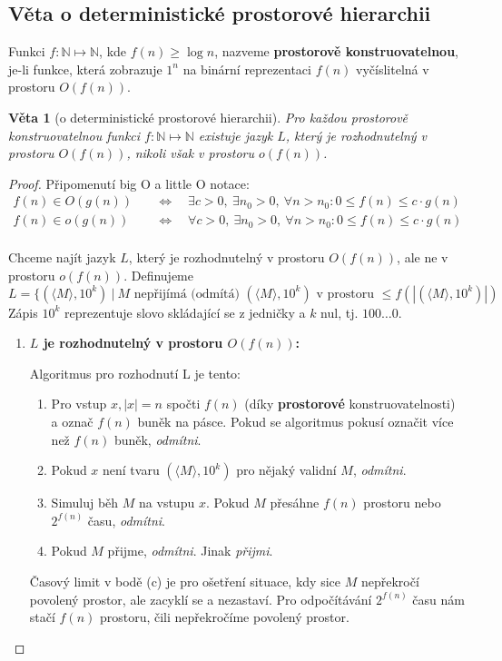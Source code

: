 \documentclass[11pt]{report} %
\newcommand{\N}{\mathbb{N}}
\newtheorem{theorem}{Věta}[section]
\numberwithin{equation}{section}
\begin{document}
\subsection{Věta o deterministické prostorové hierarchii}
Funkci $f : \N \mapsto \N$, kde $f(n) \geq \log n$, nazveme \textbf{prostorově konstruovatelnou}, je-li funkce, která zobrazuje $1^n$ na binární reprezentaci $f(n)$ vyčíslitelná v prostoru $O(f(n))$.


\begin{theorem}[o deterministické prostorové hierarchii]
Pro každou prostorově konstruovatelnou funkci $f : \N \mapsto \N$ existuje jazyk $L$, který je rozhodnutelný v prostoru $O(f(n))$, nikoli však v prostoru $o(f(n))$.
\end{theorem}

\begin{proof}
	Připomenutí big O a little O notace:
	\begin{align*}
		f(n) \in O(g(n)) \quad &\Leftrightarrow \quad \exists c > 0,\ \exists n_0 > 0,\ \forall n>n_0 : 0 \leq f(n) \leq c\cdot g(n) \\
		f(n) \in o(g(n)) \quad &\Leftrightarrow \quad \forall c > 0,\ \exists n_0 > 0,\ \forall n>n_0 : 0 \leq f(n) \leq c\cdot g(n) \\
	\end{align*}
	
	Chceme najít jazyk $L$, který je rozhodnutelný v prostoru $O(f(n))$, ale ne v prostoru $o(f(n))$. Definujeme 
	$$L = \{(\langle M \rangle, 10^k)\ |\ M \text{ nepřijímá (odmítá) } (\langle M \rangle, 10^k) \text{ v prostoru }\leq f(|(\langle M \rangle, 10^k)|) $$
	Zápis $10^k$ reprezentuje slovo skládající se z jedničky a $k$ nul, tj. $100\dots0$.
	
	\begin{enumerate}
		\item \textbf{$L$ je rozhodnutelný v prostoru $O(f(n))$:}
		
		Algoritmus pro rozhodnutí L je tento:
		\begin{enumerate}
			
			
			\item Pro vstup $x, |x| = n$ spočti $f(n)$ (díky \textbf{prostorové} konstruovatelnosti) a označ $f(n)$ buněk na pásce. Pokud se algoritmus pokusí označit více než $f(n)$ buněk, \textit{odmítni}.
			\item Pokud $x$ není tvaru $(\langle M \rangle, 10^k)$ pro nějaký validní $M$, \textit{odmítni}.
			\item Simuluj běh $M$ na vstupu $x$. Pokud $M$ přesáhne $f(n)$ prostoru nebo $2^{f(n)}$ času, \textit{odmítni}.
			\item Pokud $M$ přijme, \textit{odmítni}. Jinak \textit{přijmi}.
		\end{enumerate}
		Časový limit v bodě (c) je pro ošetření situace, kdy sice $M$ nepřekročí povolený prostor, ale zacyklí se a nezastaví. Pro odpočítávání $2^{f(n)}$ času nám stačí $f(n)$ prostoru, čili nepřekročíme povolený prostor.
		

\end{enumerate}
\end{proof}
\end{document}
